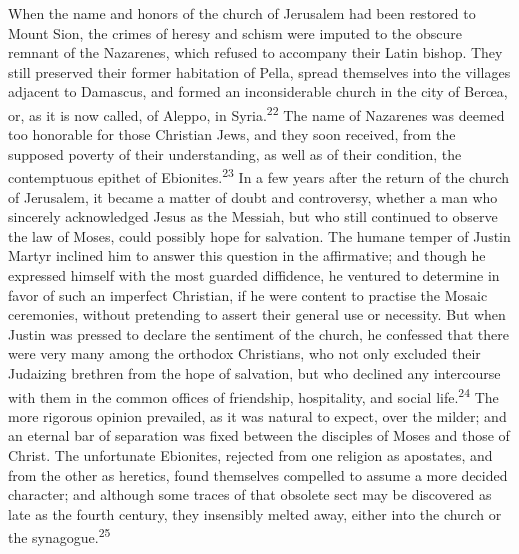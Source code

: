 

When the name and honors of the church of Jerusalem had been
restored to Mount Sion, the crimes of heresy and schism were
imputed to the obscure remnant of the Nazarenes, which refused to
accompany their Latin bishop. They still preserved their former
habitation of Pella, spread themselves into the villages adjacent
to Damascus, and formed an inconsiderable church in the city of
Berœa, or, as it is now called, of Aleppo, in Syria.\textsuperscript{22} The name
of Nazarenes was deemed too honorable for those Christian Jews,
and they soon received, from the supposed poverty of their
understanding, as well as of their condition, the contemptuous
epithet of Ebionites.\textsuperscript{23} In a few years after the return of the
church of Jerusalem, it became a matter of doubt and controversy,
whether a man who sincerely acknowledged Jesus as the Messiah,
but who still continued to observe the law of Moses, could
possibly hope for salvation. The humane temper of Justin Martyr
inclined him to answer this question in the affirmative; and
though he expressed himself with the most guarded diffidence, he
ventured to determine in favor of such an imperfect Christian, if
he were content to practise the Mosaic ceremonies, without
pretending to assert their general use or necessity. But when
Justin was pressed to declare the sentiment of the church, he
confessed that there were very many among the orthodox
Christians, who not only excluded their Judaizing brethren from
the hope of salvation, but who declined any intercourse with them
in the common offices of friendship, hospitality, and social
life.\textsuperscript{24} The more rigorous opinion prevailed, as it was natural
to expect, over the milder; and an eternal bar of separation was
fixed between the disciples of Moses and those of Christ. The
unfortunate Ebionites, rejected from one religion as apostates,
and from the other as heretics, found themselves compelled to
assume a more decided character; and although some traces of that
obsolete sect may be discovered as late as the fourth century,
they insensibly melted away, either into the church or the
synagogue.\textsuperscript{25}

